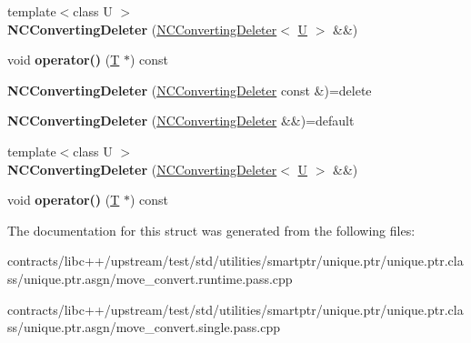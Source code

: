 \begin{DoxyCompactItemize}
\item 
\mbox{\label{struct_n_c_converting_deleter_aa87a11e9932a5db8059195ac6c9a9ca2}} 
{\footnotesize template$<$class U $>$ }\\{\bfseries N\+C\+Converting\+Deleter} (\mbox{\hyperlink{struct_n_c_converting_deleter}{N\+C\+Converting\+Deleter}}$<$ \mbox{\hyperlink{union_u}{U}} $>$ \&\&)
\item 
\mbox{\label{struct_n_c_converting_deleter_a27fe48ce0af61aaafed88a87ca004273}} 
void {\bfseries operator()} (\mbox{\hyperlink{struct_t}{T}} $\ast$) const
\item 
\mbox{\label{struct_n_c_converting_deleter_ae9e766fbeb2055f20c6763e128b8c965}} 
{\bfseries N\+C\+Converting\+Deleter} (\mbox{\hyperlink{struct_n_c_converting_deleter}{N\+C\+Converting\+Deleter}} const \&)=delete
\item 
\mbox{\label{struct_n_c_converting_deleter_a0edd25a4114507cb417605a7842cb8ae}} 
{\bfseries N\+C\+Converting\+Deleter} (\mbox{\hyperlink{struct_n_c_converting_deleter}{N\+C\+Converting\+Deleter}} \&\&)=default
\item 
\mbox{\label{struct_n_c_converting_deleter_aa87a11e9932a5db8059195ac6c9a9ca2}} 
{\footnotesize template$<$class U $>$ }\\{\bfseries N\+C\+Converting\+Deleter} (\mbox{\hyperlink{struct_n_c_converting_deleter}{N\+C\+Converting\+Deleter}}$<$ \mbox{\hyperlink{union_u}{U}} $>$ \&\&)
\item 
\mbox{\label{struct_n_c_converting_deleter_a27fe48ce0af61aaafed88a87ca004273}} 
void {\bfseries operator()} (\mbox{\hyperlink{struct_t}{T}} $\ast$) const
\end{DoxyCompactItemize}


The documentation for this struct was generated from the following files\+:\begin{DoxyCompactItemize}
\item 
contracts/libc++/upstream/test/std/utilities/smartptr/unique.\+ptr/unique.\+ptr.\+class/unique.\+ptr.\+asgn/move\+\_\+convert.\+runtime.\+pass.\+cpp\item 
contracts/libc++/upstream/test/std/utilities/smartptr/unique.\+ptr/unique.\+ptr.\+class/unique.\+ptr.\+asgn/move\+\_\+convert.\+single.\+pass.\+cpp\end{DoxyCompactItemize}
